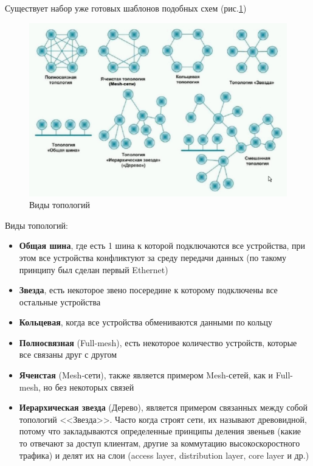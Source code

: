 \documentclass[a4paper]{article}
\begin{document}
Существует набор уже готовых шаблонов подобных схем (рис.\ref{fig:pic-10-topology-types})
\begin{figure}[!h]
	\centering
	\includegraphics[width=\textwidth]{10-topology-types}
	\caption{Виды топологий}
	\label{fig:pic-10-topology-types}
\end{figure}

Виды топологий:
\begin{itemize}
	\item \textbf{Общая шина}, где есть 1 шина к которой подключаются все устройства, при этом все устройства конфликтуют за среду передачи данных (по такому принципу был сделан первый Ethernet)
	\item \textbf{Звезда}, есть некоторое звено посередине к которому подключены все остальные устройства
	\item \textbf{Кольцевая}, когда все устройства обмениваются данными по кольцу
	\item \textbf{Полносвязная} (Full-mesh), есть некоторое количество устройств, которые все связаны друг с другом
	\item \textbf{Ячеистая} (Mesh-сети), также является примером Mesh-сетей, как и Full-mesh, но без некоторых связей
	\item \textbf{Иерархическая звезда} (Дерево), является примером связанных между собой топологий <<Звезда>>. Часто когда строят сети, их называют древовидной, потому что закладываются определенные принципы деления звеньев (какие то отвечают за доступ клиентам, другие за коммутацию высокоскоростного трафика) и делят их на слои (access layer, distribution layer, core layer и др.)
\end{itemize}
\end{document}
